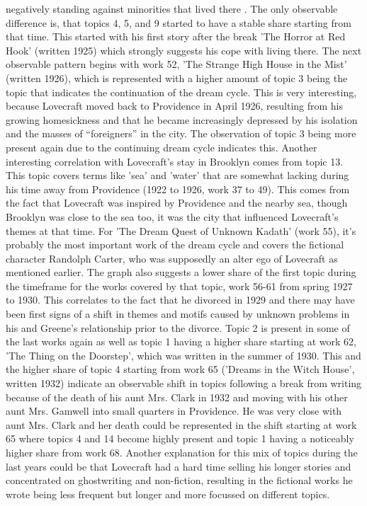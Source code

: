 negatively standing against minorities that lived there \cite{carter}. The only observable difference is, that 
topics 4, 5, and 9 started to have a stable share starting from that time. This started with his 
first story after the break 'The Horror at Red Hook' (written 1925) which strongly suggests his 
cope with living there. The next observable pattern begins with work 52, 'The Strange High House 
in the Mist' (written 1926), which is represented with a higher amount of topic 3 being the topic 
that indicates the continuation of the dream cycle. This is very interesting, because Lovecraft 
moved back to Providence in April 1926, resulting from his growing homesickness and that he became 
increasingly depressed by his isolation and the masses of “foreigners” in the city. The observation 
of topic 3 being more present again due to the continuing dream cycle indicates this. Another 
interesting correlation with Lovecraft's stay in Brooklyn comes from topic 13. This topic covers 
terms like 'sea' and 'water' that are somewhat lacking during his time away from Providence (1922 
to 1926, work 37 to 49). This comes from the fact that Lovecraft was inspired by Providence and 
the nearby sea, though Brooklyn was close to the sea too, it was the city that influenced Lovecraft's 
themes at that time. For 'The Dream Quest of Unknown Kadath' (work 55), it's probably the most 
important work of the dream cycle and covers the fictional character Randolph Carter, who was 
supposedly an alter ego of Lovecraft as mentioned earlier. The graph also suggests a lower share 
of the first topic during the timeframe for the works covered by that topic, work 56-61 from spring 
1927 to 1930. This correlates to the fact that he divorced in 1929 and there may have been first 
signs of a shift in themes and motifs caused by unknown problems in his and Greene's relationship 
prior to the divorce. Topic 2 is present in some of the last works again as well as topic 1 having 
a higher share starting at work 62, 'The Thing on the Doorstep', which was written in the summer of 
1930. This and the higher share of topic 4 starting from work 65 ('Dreams in the Witch House', written 
1932) indicate an observable shift in topics following a break from writing because of the death of 
his aunt Mrs. Clark in 1932 and moving with his other aunt Mrs. Gamwell into small quarters in 
Providence. He was very close with aunt Mrs. Clark and her death could be represented in the shift 
starting at work 65 where topics 4 and 14 become highly present and topic 1 having a noticeably 
higher share from work 68. Another explanation for this mix of topics during the last years could 
be that Lovecraft had a hard time selling his longer stories and concentrated on ghostwriting and 
non-fiction, resulting in the fictional works he wrote being less frequent but longer and more 
focussed on different topics.\\


